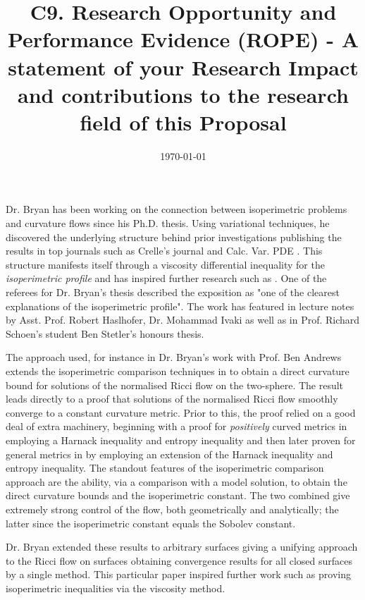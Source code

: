 \documentclass[12pt]{amsart}
\date{}
\author{}
\date{\today}
\title{C9. Research Opportunity and Performance Evidence (ROPE) - A statement of your Research Impact and contributions to the research field of this Proposal}
\begin{document}
\maketitle

Dr. Bryan has been working on the connection between isoperimetric problems and curvature flows since his Ph.D. thesis. Using variational techniques, he discovered the underlying structure behind prior investigations \cite{MR1369140,MR1369139,MR1656553} publishing the results in top journals such as Crelle's journal and Calc. Var. PDE \cite{MR2729306,MR2794630,MR2843240,Bryan}. This structure manifests itself through a viscosity differential inequality for the \emph{isoperimetric profile} and has inspired further research such as \cite{MR3544942, MR3570462}. One of the referees for Dr. Bryan's thesis described the exposition as "one of the clearest explanations of the isoperimetric profile". The work has featured in lecture notes by Asst. Prof. Robert Haslhofer, Dr. Mohammad Ivaki as well as in Prof. Richard Schoen's student Ben Stetler's honours thesis.

The approach used, for instance in Dr. Bryan's work with Prof. Ben Andrews \cite{MR2729306} extends the isoperimetric comparison techniques in \cite{MR1369140,MR1369139} to obtain a direct curvature bound for solutions of the normalised Ricci flow on the two-sphere. The result leads directly to a proof that solutions of the normalised Ricci flow smoothly converge to a constant curvature metric. Prior to this, the proof relied on a good deal of extra machinery, beginning with a proof for \emph{positively} curved metrics in \cite{MR954419} employing a Harnack inequality and entropy inequality and then later proven for general metrics in \cite{MR1094458} by employing an extension of the Harnack inequality and entropy inequality. The standout features of the isoperimetric comparison approach are the ability, via a comparison with a model solution, to obtain the direct curvature bounds and the isoperimetric constant. The two combined give extremely strong control of the flow, both geometrically and analytically; the latter since the isoperimetric constant equals the Sobolev constant.

Dr. Bryan extended these results to arbitrary surfaces \cite{Bryan} giving a unifying approach to the Ricci flow on surfaces obtaining convergence results for all closed surfaces by a single method. This particular paper inspired further work such as \cite{MR3544942} proving isoperimetric inequalities via the viscosity method.
\end{document}
